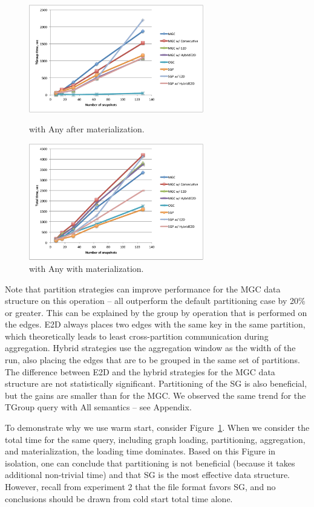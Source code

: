 \begin{figure}[t!]
\centering
\begin{minipage}{3.3in}
  \centering
  \includegraphics[width=3in]{figs/tgroupe_warm.pdf}
  \caption{ with Any after materialization.}
  \label{fig:tgroupe}
\end{minipage}
\begin{minipage}{3.3in}
  \centering
  \includegraphics[width=3in]{figs/tgroupe_cold.pdf}
  \caption{ with Any with materialization.}
\label{fig:tgroupe_cold}
\end{minipage}
\end{figure}

Note that partition strategies can improve performance for the MGC
data structure on this operation -- all outperform the default
partitioning case by 20\% or greater.  This can be explained by the
group by operation that is performed on the edges.  E2D always places
two edges with the same key in the same partition, which theoretically
leads to least cross-partition communication during aggregation.
Hybrid strategies use the aggregation window as the width of the run,
also placing the edges that are to be grouped in the same set of
partitions.  The difference between E2D and the hybrid strategies for
the MGC data structure are not statistically significant.
Partitioning of the SG is also beneficial, but the gains are smaller
than for the MGC.  We observed the same trend for the TGroup query
with All semantics -- see Appendix.

To demonstrate why we use warm start, consider
Figure~\ref{fig:tgroupe_cold}.  When we consider the total time for
the same query, including graph loading, partitioning, aggregation,
and materialization, the loading time dominates.  Based on this Figure
in isolation, one can conclude that partitioning is not beneficial
(because it takes additional non-trivial time) and that SG is the most
effective data structure.  However, recall from experiment 2 that the
file format favors SG, and no conclusions should be drawn from cold
start total time alone.

